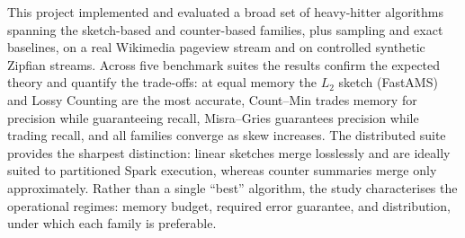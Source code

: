 \documentclass[12pt]{article}
\begin{document}
This project implemented and evaluated a broad set of heavy-hitter algorithms
spanning the sketch-based and counter-based families, plus sampling and exact
baselines, on a real Wikimedia pageview stream and on controlled synthetic
Zipfian streams. Across five benchmark suites the results confirm the expected
theory and quantify the trade-offs: at equal memory the $L_2$ sketch (FastAMS)
and Lossy Counting are the most accurate, Count--Min trades memory for precision
while guaranteeing recall, Misra--Gries guarantees precision while trading
recall, and all families converge as skew increases. The distributed suite
provides the sharpest distinction: linear sketches merge losslessly and are
ideally suited to partitioned Spark execution, whereas counter summaries merge
only approximately. Rather than a single ``best'' algorithm, the study
characterises the operational regimes: memory budget, required error
guarantee, and distribution, under which each family is preferable.
\end{document}
